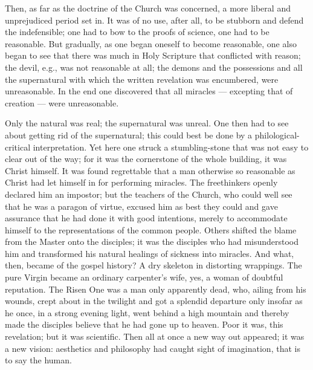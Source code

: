 \documentclass[12pt,a4paper,openany]{book}
\newcommand{\opage}[1]{\marginnote{\footnotesize\textit{[#1]}}}
\begin{document}
Then, as far as the doctrine of the Church was concerned, a more liberal and unprejudiced period set in.
It
\setcounter{footnote}{0}%
\opage{34}was of no use, after all, to be stubborn and defend the indefensible; one had to bow to the proofs of science, one had to be reasonable. But gradually, as one began oneself to become reasonable, one also began to see that there was much in Holy Scripture that conflicted with reason; the devil, e.g., was not reasonable at all; the demons and the possessions and all the supernatural with which the written revelation was encumbered, were unreasonable. In the end one discovered that all miracles --- excepting that of creation --- were unreasonable.

Only the natural was real; the supernatural was unreal. One then had to see about getting rid of the supernatural; this could best be done by a philological-critical interpretation. Yet here one struck a stumbling-stone that was not easy to clear out of the way; for it was the cornerstone of the whole building, it was Christ himself. It was found regrettable that a man otherwise so reasonable as Christ had let himself in for performing miracles. The freethinkers openly declared him an impostor; but the teachers of the Church, who could well see that he was a paragon of virtue, excused him as best they could and gave assurance that he had done it with good intentions, merely to accommodate himself to the representations of the common people. Others shifted the blame from the Master onto the disciples; it was the disciples who had misunderstood him and transformed his natural healings of sickness into miracles. And what, then, became of the gospel history? A dry skeleton in distorting wrappings. The pure Virgin became an ordinary carpenter's wife, yes, a woman of doubtful reputation. The Risen One was a man only apparently dead, who, ailing from his wounds, crept
\setcounter{footnote}{0}%
\opage{35}about in the twilight and got a splendid departure only insofar as he once, in a strong evening light, went behind a high mountain and thereby made the disciples believe that he had gone up to heaven. Poor it was, this revelation; but it was scientific. Then all at once a new way out appeared; it was a new vision: aesthetics and philosophy had caught sight of imagination, that is to say the human.
\end{document}
